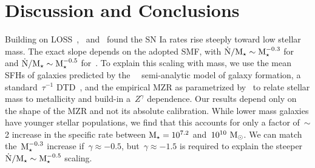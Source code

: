 \documentclass[ms.tex]{subfiles}
\begin{document}
\section{Discussion and Conclusions}
\label{sec:conclusions}

Building on LOSS~\citep{Li2011},~\citet{Brown2019} and~\citet{Wiseman2021}
found the SN Ia rates rise steeply toward low stellar mass.
The exact slope depends on the adopted SMF, with
$\dot{\text{N}} / \text{M}_\star \sim \text{M}_\star^{-0.3}$ for~\citet{Baldry2012} and
$\dot{\text{N}} / \text{M}_\star \sim \text{M}_\star^{-0.5}$ for~\citet{Bell2003}.
To explain this scaling with mass, we use the mean SFHs of galaxies predicted
by the~\um~\citep{Behroozi2019} semi-analytic model of galaxy formation, a
standard~$\tau^{-1}$ DTD~\citep[e.g.,][]{Maoz2012a}, and the empirical MZR as
parametrized by~\citet{Zahid2014} to relate stellar mass to metallicity and
build-in a~$Z^\gamma$ dependence.
Our results depend only on the shape of the MZR and not its absolute
calibration.
While lower mass galaxies have younger stellar populations, we find that this
accounts for only a factor of~$\sim$2 increase in the specific rate between
$\text{M}_\star = 10^{7.2}$ and~$10^{10}~\text{M}_\odot$.
We can match the~$\text{M}_\star^{-0.3}$ increase if~$\gamma \approx -0.5$,
but~$\gamma \approx -1.5$ is required to explain the steeper
$\dot{\text{N}} / \text{M}_\star \sim \text{M}_\star^{-0.5}$ scaling.
\par
\end{document}
